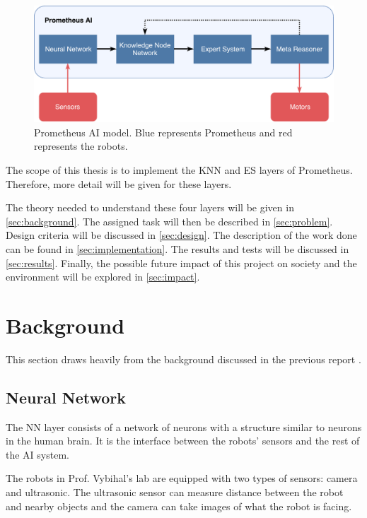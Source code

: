\documentclass[titlepage,11pt]{article}
\begin{document}
\begin{figure}[!htb]
	\includegraphics[width=\textwidth]{figures/ai_model.pdf}
	\caption[Prometheus AI model.]{Prometheus AI model. Blue represents Prometheus and red represents the robots.}
	\label{model}
\end{figure}

The scope of this thesis is to implement the KNN and ES layers of Prometheus. Therefore, more detail will be given for these layers.

The theory needed to understand these four layers will be given in \autoref{sec:background}. The assigned task will then be described in \autoref{sec:problem}. Design criteria will be discussed in \autoref{sec:design}. The description of the work done can be found in \autoref{sec:implementation}. The results and tests will be discussed in \autoref{sec:results}. Finally, the possible future impact of this project on society and the environment will be explored in \autoref{sec:impact}.

\section{Background} \label{sec:background}
This section draws heavily from the background discussed in the previous report \cite{stappas}.

\subsection{Neural Network}

The NN layer consists of a network of neurons with a structure similar to neurons in the human brain. It is the interface between the robots' sensors and the rest of the AI system.

The robots in Prof. Vybihal's lab are equipped with two types of sensors: camera and ultrasonic. The ultrasonic sensor can measure distance between the robot and nearby objects and the camera can take images of what the robot is facing.
\end{document}
